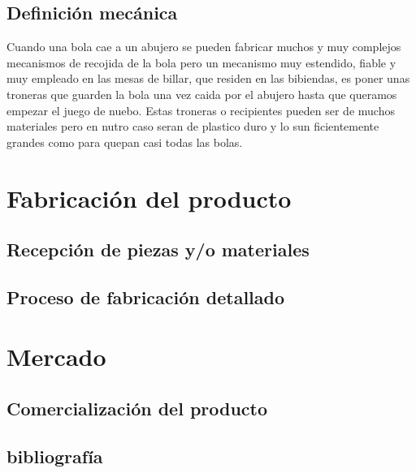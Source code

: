 		    

	\subsection {Definición mecánica}
		    Cuando una bola cae a un abujero se pueden fabricar muchos y muy complejos mecanismos de recojida de la bola pero un mecanismo muy estendido,
		    fiable y muy empleado en las mesas de billar, que residen en las bibiendas, es poner unas troneras que guarden la bola una vez caida por el abujero hasta que queramos empezar
		    el juego de nuebo. Estas troneras o recipientes pueden ser de muchos materiales pero en nutro caso seran de plastico duro y lo sun ficientemente grandes como para quepan casi todas las bolas. 
\section {Fabricación del producto}

	\subsection {Recepción de piezas y/o materiales}

	\subsection {Proceso de fabricación detallado}

\section {Mercado}

	\subsection {Comercialización del producto}


\subsection{bibliografía}




